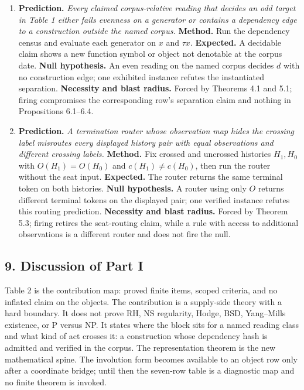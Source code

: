 \documentclass[10pt,twocolumn]{article}
\begin{document}
\begin{enumerate}
\def\labelenumi{\arabic{enumi}.}
\item
  \textbf{Prediction.} \emph{Every claimed corpus-relative reading that
  decides an odd target in Table 1 either fails evenness on a generator
  or contains a dependency edge to a construction outside the named
  corpus.} \textbf{Method.} Run the dependency census and evaluate each
  generator on \(x\) and \(\tau x\). \textbf{Expected.} A decidable
  claim shows a new function symbol or object not denotable at the
  corpus date. \textbf{Null hypothesis.} An even reading on the named
  corpus decides \(d\) with no construction edge; one exhibited instance
  refutes the instantiated separation. \textbf{Necessity and blast
  radius.} Forced by Theorems 4.1 and 5.1; firing compromises the
  corresponding row's separation claim and nothing in Propositions
  6.1--6.4.
\item
  \textbf{Prediction.} \emph{A termination router whose observation map
  hides the crossing label misroutes every displayed history pair with
  equal observations and different crossing labels.} \textbf{Method.}
  Fix crossed and uncrossed histories \(H_1, H_0\) with
  \(O(H_1) = O(H_0)\) and \(c(H_1) \neq c(H_0)\), then run the router
  without the seat input. \textbf{Expected.} The router returns the same
  terminal token on both histories. \textbf{Null hypothesis.} A router
  using only \(O\) returns different terminal tokens on the displayed
  pair; one verified instance refutes this routing prediction.
  \textbf{Necessity and blast radius.} Forced by Theorem 5.3; firing
  retires the seat-routing claim, while a rule with access to additional
  observations is a different router and does not fire the null.
\end{enumerate}

\subsection{9. Discussion of Part I}\label{discussion-of-part-i}

Table 2 is the contribution map: proved finite items, scoped criteria,
and no inflated claim on the objects. The contribution is a supply-side
theory with a hard boundary. It does not prove RH, NS regularity, Hodge,
BSD, Yang--Mills existence, or P versus NP. It states where the block
sits for a named reading class and what kind of act crosses it: a
construction whose dependency hash is admitted and verified in the
corpus. The representation theorem is the new mathematical spine. The
involution form becomes available to an object row only after a
coordinate bridge; until then the seven-row table is a diagnostic map
and no finite theorem is invoked.
\end{document}
